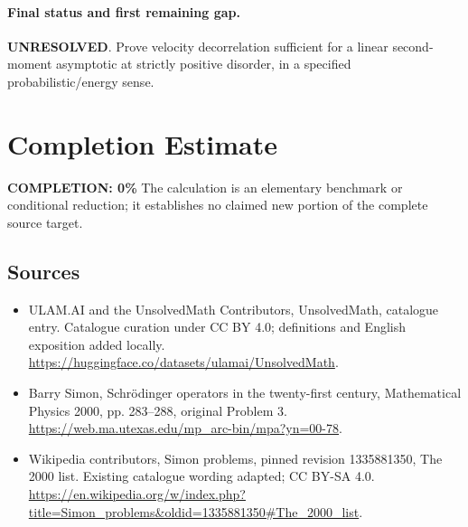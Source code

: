 \documentclass[11pt]{article}
\begin{document}
\paragraph{Final status and first remaining gap.}
\textbf{UNRESOLVED}. Prove velocity decorrelation sufficient for a linear second-moment asymptotic at strictly positive disorder, in a specified probabilistic/energy sense.

\section{Completion Estimate}
\noindent\textbf{COMPLETION: 0\%}
The calculation is an elementary benchmark or conditional reduction; it establishes no claimed new portion of the complete source target.

\subsection{Sources}
\begin{itemize}
\item[\hypertarget{source:statement:1}{S1}] ULAM.AI and the UnsolvedMath Contributors, UnsolvedMath, catalogue entry. Catalogue curation under CC BY 4.0; definitions and English exposition added locally.
\url{https://huggingface.co/datasets/ulamai/UnsolvedMath}.
\item[\hypertarget{source:statement:2}{S2}] Barry Simon, Schrödinger operators in the twenty-first century, Mathematical Physics 2000, pp. 283–288, original Problem 3.
\url{https://web.ma.utexas.edu/mp_arc-bin/mpa?yn=00-78}.
\item[\hypertarget{source:statement:3}{S3}] Wikipedia contributors, Simon problems, pinned revision 1335881350, The 2000 list. Existing catalogue wording adapted; CC BY-SA 4.0.
\url{https://en.wikipedia.org/w/index.php?title=Simon_problems&oldid=1335881350#The_2000_list}.
\end{itemize}
\label{end:statement}
\end{document}

